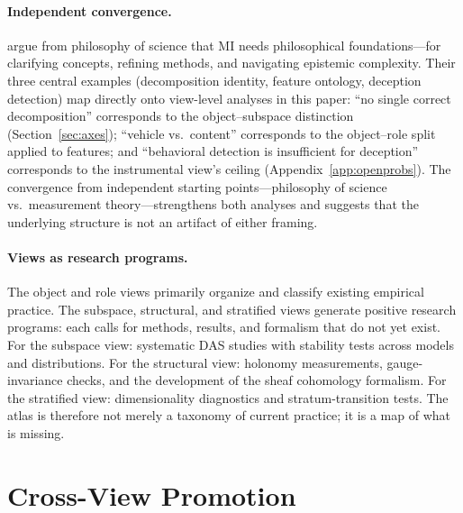 \documentclass[11pt]{article}
\theoremstyle{remark}
\begin{document}
\paragraph{Independent convergence.}
\citet{williams2025} argue from philosophy of science that MI needs
philosophical foundations---for clarifying concepts, refining methods,
and navigating epistemic complexity.  Their three central examples
(decomposition identity, feature ontology, deception detection) map
directly onto view-level analyses in this paper: ``no single correct
decomposition'' corresponds to the object--subspace distinction
(Section~\ref{sec:axes}); ``vehicle vs.\ content'' corresponds to the
object--role split applied to features; and ``behavioral detection is
insufficient for deception'' corresponds to the instrumental view's
ceiling (Appendix~\ref{app:openprobs}).  The convergence from
independent starting points---philosophy of science vs.\ measurement
theory---strengthens both analyses and suggests that the underlying
structure is not an artifact of either framing.

\paragraph{Views as research programs.}
The object and role views primarily organize and classify existing
empirical practice.  The subspace, structural, and stratified views
generate positive research programs: each calls for methods, results,
and formalism that do not yet exist.  For the subspace view: systematic
DAS studies with stability tests across models and distributions.  For
the structural view: holonomy measurements, gauge-invariance checks,
and the development of the sheaf cohomology formalism.  For the
stratified view: dimensionality diagnostics and stratum-transition
tests.  The atlas is therefore not merely a taxonomy of current
practice; it is a map of what is missing.

\section{Cross-View Promotion}\label{sec:promotion}
\end{document}
